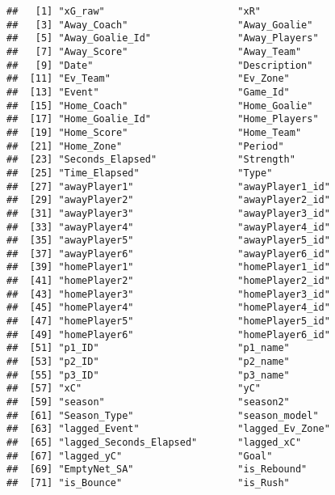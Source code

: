 \documentclass[]{article}
\begin{document}
\begin{verbatim}
##   [1] "xG_raw"                       "xR"                          
##   [3] "Away_Coach"                   "Away_Goalie"                 
##   [5] "Away_Goalie_Id"               "Away_Players"                
##   [7] "Away_Score"                   "Away_Team"                   
##   [9] "Date"                         "Description"                 
##  [11] "Ev_Team"                      "Ev_Zone"                     
##  [13] "Event"                        "Game_Id"                     
##  [15] "Home_Coach"                   "Home_Goalie"                 
##  [17] "Home_Goalie_Id"               "Home_Players"                
##  [19] "Home_Score"                   "Home_Team"                   
##  [21] "Home_Zone"                    "Period"                      
##  [23] "Seconds_Elapsed"              "Strength"                    
##  [25] "Time_Elapsed"                 "Type"                        
##  [27] "awayPlayer1"                  "awayPlayer1_id"              
##  [29] "awayPlayer2"                  "awayPlayer2_id"              
##  [31] "awayPlayer3"                  "awayPlayer3_id"              
##  [33] "awayPlayer4"                  "awayPlayer4_id"              
##  [35] "awayPlayer5"                  "awayPlayer5_id"              
##  [37] "awayPlayer6"                  "awayPlayer6_id"              
##  [39] "homePlayer1"                  "homePlayer1_id"              
##  [41] "homePlayer2"                  "homePlayer2_id"              
##  [43] "homePlayer3"                  "homePlayer3_id"              
##  [45] "homePlayer4"                  "homePlayer4_id"              
##  [47] "homePlayer5"                  "homePlayer5_id"              
##  [49] "homePlayer6"                  "homePlayer6_id"              
##  [51] "p1_ID"                        "p1_name"                     
##  [53] "p2_ID"                        "p2_name"                     
##  [55] "p3_ID"                        "p3_name"                     
##  [57] "xC"                           "yC"                          
##  [59] "season"                       "season2"                     
##  [61] "Season_Type"                  "season_model"                
##  [63] "lagged_Event"                 "lagged_Ev_Zone"              
##  [65] "lagged_Seconds_Elapsed"       "lagged_xC"                   
##  [67] "lagged_yC"                    "Goal"                        
##  [69] "EmptyNet_SA"                  "is_Rebound"                  
##  [71] "is_Bounce"                    "is_Rush"                     

\end{verbatim}
\end{document}
